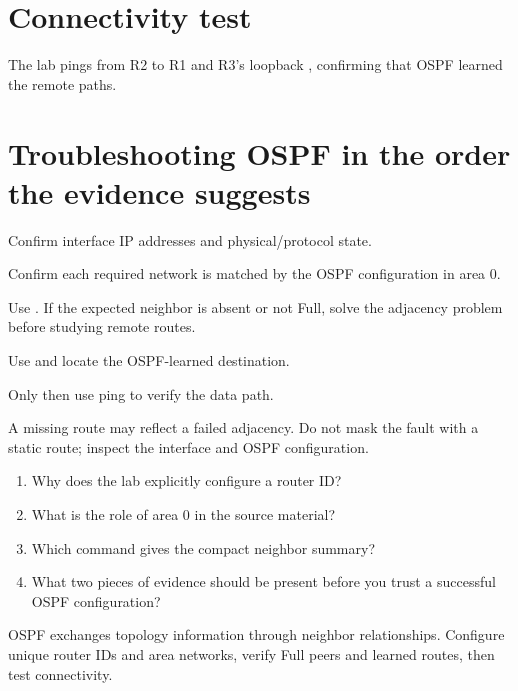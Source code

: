 \section{Connectivity test}
The lab pings from R2 to R1 and R3's loopback , confirming that OSPF learned the remote paths.

\section{Troubleshooting OSPF in the order the evidence suggests}
\begin{netsteps}
\item Confirm interface IP addresses and physical/protocol state.
\item Confirm each required network is matched by the OSPF configuration in area 0.
\item Use . If the expected neighbor is absent or not Full, solve the adjacency problem before studying remote routes.
\item Use  and locate the OSPF-learned destination.
\item Only then use ping to verify the data path.
\end{netsteps}

\begin{pitfall}
A missing route may reflect a failed adjacency. Do not mask the fault with a static route; inspect the interface and OSPF configuration.
\end{pitfall}

\begin{quickcheck}
\begin{enumerate}
\item Why does the lab explicitly configure a router ID?
\item What is the role of area 0 in the source material?
\item Which command gives the compact neighbor summary?
\item What two pieces of evidence should be present before you trust a successful OSPF configuration?
\end{enumerate}
\end{quickcheck}

\begin{chapterrecap}
OSPF exchanges topology information through neighbor relationships. Configure unique router IDs and area networks, verify Full peers and learned routes, then test connectivity.
\end{chapterrecap}


